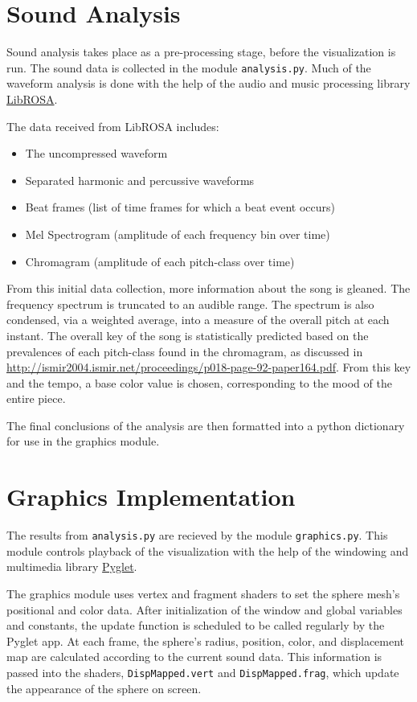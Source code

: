 \documentclass{article}
\newcommand{\code}{\texttt}
\begin{document}
\section{Sound Analysis}

Sound analysis takes place as a pre-processing stage, before the visualization is run. The sound data is collected in the module \code{analysis.py}. Much of the waveform analysis is done with the help of the audio and music processing library \href{https://github.com/bmcfee/librosa/}{LibROSA}.

The data received from LibROSA includes:

\begin{itemize}
    \item The uncompressed waveform
    \item Separated harmonic and percussive waveforms
    \item Beat frames (list of time frames for which a beat event occurs)
    \item Mel Spectrogram (amplitude of each frequency bin over time)
    \item Chromagram (amplitude of each pitch-class over time)
\end{itemize}

From this initial data collection, more information about the song is gleaned. The frequency spectrum is truncated to an audible range. The spectrum is also condensed, via a weighted average, into a measure of the overall pitch at each instant. The overall key of the song is statistically predicted based on the prevalences of each pitch-class found in the chromagram, as discussed in \url{http://ismir2004.ismir.net/proceedings/p018-page-92-paper164.pdf}. From this key and the tempo, a base color value is chosen, corresponding to the mood of the entire piece.

The final conclusions of the analysis are then formatted into a python dictionary for use in the graphics module.

\section{Graphics Implementation}

The results from \code{analysis.py} are recieved by the module \code{graphics.py}. This module controls playback of the visualization with the help of the windowing and multimedia library \href{http://www.pyglet.org/}{Pyglet}.

The graphics module uses vertex and fragment shaders to set the sphere mesh's positional and color data. After initialization of the window and global variables and constants, the update function is scheduled to be called regularly by the Pyglet app. At each frame, the sphere's radius, position, color, and displacement map are calculated according to the current sound data. This information is passed into the shaders, \code{DispMapped.vert} and \code{DispMapped.frag}, which update the appearance of the sphere on screen.
\end{document}
